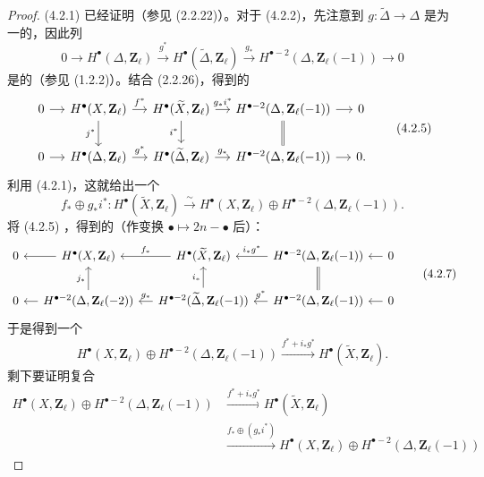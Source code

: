 \begin{proof}
(4.2.1) 已经证明（参见 (2.2.22)）。对于 (4.2.2)，先注意到 $g:\widetilde\Delta\to\Delta$ 是为一的，因此列
\[
 0\longrightarrow H^\bullet(\Delta,\mathbf Z_\ell)\xrightarrow{g^*}H^\bullet(\widetilde\Delta,\mathbf Z_\ell)\xrightarrow{g_*}H^{\bullet-2}(\Delta,\mathbf Z_\ell(-1))\longrightarrow0\tag{4.2.4}
\]
是的（参见 (1.2.2)）。结合 (2.2.26)，得到的
\[
\begin{tikzcd}[column sep=small]
0\arrow[r]&H^\bullet(X,\mathbf Z_\ell)\arrow[r,"f^*"]\arrow[d,"j^*"']&H^\bullet(\widetilde X,\mathbf Z_\ell)\arrow[r,"g_*i^*"]\arrow[d,"i^*"']&H^{\bullet-2}(\Delta,\mathbf Z_\ell(-1))\arrow[r]\arrow[d,equal]&0\\
0\arrow[r]&H^\bullet(\Delta,\mathbf Z_\ell)\arrow[r,"g^*"]&H^\bullet(\widetilde\Delta,\mathbf Z_\ell)\arrow[r,"g_*"]&H^{\bullet-2}(\Delta,\mathbf Z_\ell(-1))\arrow[r]&0.
\end{tikzcd}\tag{4.2.5}
\]
利用 (4.2.1)，这就给出一个
\[
 f_*\oplus g_*i^*:H^\bullet(\widetilde X,\mathbf Z_\ell)\xrightarrow{\sim}H^\bullet(X,\mathbf Z_\ell)\oplus H^{\bullet-2}(\Delta,\mathbf Z_\ell(-1)).\tag{4.2.6}
\]
将 (4.2.5) ，得到的（作变换 $\bullet\mapsto2n-\bullet$ 后）：
\[
\begin{tikzcd}[column sep=small]
0&H^\bullet(X,\mathbf Z_\ell)\arrow[l]&H^\bullet(\widetilde X,\mathbf Z_\ell)\arrow[l,"f_*"']&H^{\bullet-2}(\Delta,\mathbf Z_\ell(-1))\arrow[l,"i_*g^*"']&0\arrow[l]\\
0&H^{\bullet-2}(\Delta,\mathbf Z_\ell(-2))\arrow[l]\arrow[u,"j_*"]&H^{\bullet-2}(\widetilde\Delta,\mathbf Z_\ell(-1))\arrow[l,"g_*"']\arrow[u,"i_*"]&H^{\bullet-2}(\Delta,\mathbf Z_\ell(-1))\arrow[l,"g^*"']\arrow[u,equal]&0\arrow[l]
\end{tikzcd}\tag{4.2.7}
\]
于是得到一个
\[
 H^\bullet(X,\mathbf Z_\ell)\oplus H^{\bullet-2}(\Delta,\mathbf Z_\ell(-1))\xrightarrow{f^*+i_*g^*}H^\bullet(\widetilde X,\mathbf Z_\ell).\tag{4.2.8}
\]
剩下要证明复合
\[
\begin{aligned}
H^\bullet(X,\mathbf Z_\ell)\oplus H^{\bullet-2}(\Delta,\mathbf Z_\ell(-1))&\xrightarrow{f^*+i_*g^*}H^\bullet(\widetilde X,\mathbf Z_\ell)\\
&\xrightarrow{f_*\oplus(g_*i^*)}H^\bullet(X,\mathbf Z_\ell)\oplus H^{\bullet-2}(\Delta,\mathbf Z_\ell(-1))

\end{aligned}\]
\end{proof}
